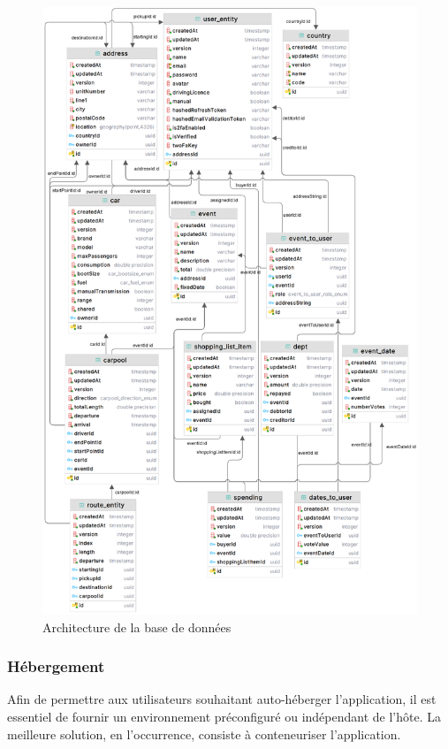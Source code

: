\begin{figure}[htbp]
    \includegraphics[width=\linewidth]{./images/dbShema}\caption{Architecture de la base de données}\label{fig:dbSchema}
    \centering
\end{figure}

\subsubsection{Hébergement}\label{subsubsec:hebergement}
Afin de permettre aux utilisateurs souhaitant auto-héberger l'application, il est essentiel de fournir un environnement préconfiguré ou indépendant de l'hôte.
La meilleure solution, en l'occurrence, consiste à conteneuriser l'application.

